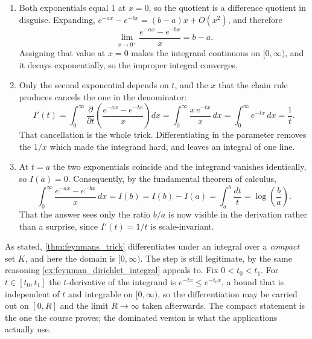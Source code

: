 \begin{exercisesolution}
\label{sol:ai_frullani}
\begin{enumerate}[label=\textbf{(\alph*)}]
  \item Both exponentials equal $1$ at $x = 0$, so the quotient is a difference quotient in
    disguise. Expanding, $e^{-ax} - e^{-bx} = (b-a)x + O(x^2)$, and therefore
    \[\lim_{x\to0^+}\frac{e^{-ax} - e^{-bx}}{x} = b - a.\]
    Assigning that value at $x = 0$ makes the integrand continuous on $[0,\infty)$, and it decays
    exponentially, so the improper integral converges.
  \item Only the second exponential depends on $t$, and the $x$ that the chain rule produces
    cancels the one in the denominator:
    \[I'(t) = \int_0^\infty \frac{\partial}{\partial t}\left(\frac{e^{-ax} - e^{-tx}}{x}\right)dx
            = \int_0^\infty \frac{x\,e^{-tx}}{x}\,dx
            = \int_0^\infty e^{-tx}\,dx
            = \frac{1}{t}.\]
    That cancellation is the whole trick. Differentiating in the parameter removes the $1/x$
    which made the integrand hard, and leaves an integral of one line.
  \item At $t = a$ the two exponentials coincide and the integrand vanishes identically, so
    $I(a) = 0$. Consequently, by the fundamental theorem of calculus,
    \[\int_0^\infty \frac{e^{-ax} - e^{-bx}}{x}\,dx = I(b) = I(b) - I(a) = \int_a^b \frac{dt}{t}
      = \log\!\left(\frac{b}{a}\right).\]
    That the answer sees only the ratio $b/a$ is now visible in the derivation rather than a
    surprise, since $I'(t) = 1/t$ is scale-invariant.
\end{enumerate}

\begin{remark}
\label{rem:feynman_on_a_half_line}
As stated, \cref{thm:feynmans_trick} differentiates under an integral over a \emph{compact} set
$K$, and here the domain is $[0,\infty)$. The step is still legitimate, by the same reasoning
\cref{ex:feynman_dirichlet_integral} appeals to. Fix $0 < t_0 < t_1$. For $t \in [t_0,t_1]$ the
$t$-derivative of the integrand is $e^{-tx} \leq e^{-t_0x}$, a bound that is independent of $t$
and integrable on $[0,\infty)$, so the differentiation may be carried out on $[0,R]$ and the
limit $R \to \infty$ taken afterwards. The compact statement is the one the course proves; the
dominated version is what the applications actually use.
\end{remark}
\end{exercisesolution}

